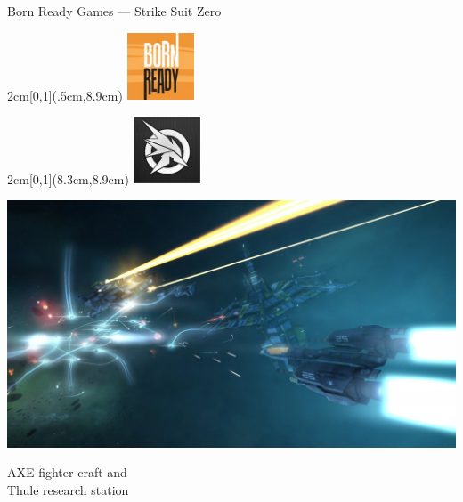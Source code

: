 \documentclass[t]{beamer}
\begin{document}
		\begin{frame}{Born Ready Games --- Strike Suit Zero}
			\begin{textblock*}{2cm}[0,1](.5cm,8.9cm) %
			\includegraphics[width=2cm]{bornready.jpg}
			\end{textblock*}
			\begin{textblock*}{2cm}[0,1](8.3cm,8.9cm) %
			\includegraphics[width=2cm]{strikesuitzero.jpg}
			\end{textblock*}
			\includegraphics[width=\linewidth]{station.jpg}
			\begin{center}
			AXE fighter craft and \\
			Thule research station
			\end{center}
		\end{frame}
\end{document}
